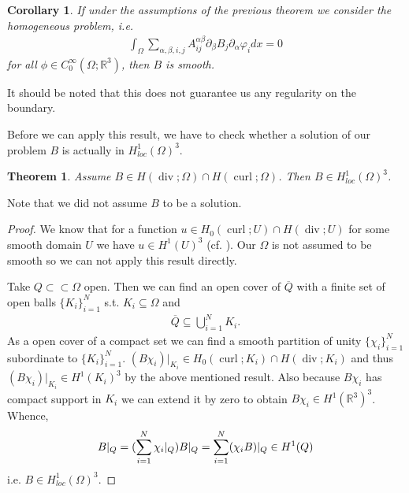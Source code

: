 \documentclass[12pt,a4paper]{article}
\numberwithin{equation}{subsection}
\numberwithin{lemma}{subsection}
\newtheorem{corollary}[lemma]{Corollary}
\newtheorem{theorem}[lemma]{Theorem}
\theoremstyle{definition}
\DeclareMathOperator{\curl}{curl}
\DeclareMathOperator{\diver}{div}
\newcommand{\real}{\mathbb{R}}
\begin{document}
\begin{corollary}\label{cor:smooth_solution}
    If under the assumptions of the previous theorem we consider the 
    homogeneous problem, i.e.
    \begin{align*}
        \int_\Omega \sum\limits_{\alpha,\beta,i,j} 
        A_{ij}^{\alpha \beta} \partial_\beta B_j \partial_\alpha \varphi_i dx =0
    \end{align*}
    for all $\phi \in C^\infty_0(\Omega;\real^3)$, then $B$ is smooth.   
\end{corollary}
It should be noted that this does not guarantee us any regularity on the 
boundary. 

Before we can apply this result, we have to check whether a solution of our 
problem $B$ is actually in $H^1_{loc}(\Omega)^3$. 

\begin{theorem}\label{thm:solution_in_H1loc}
    Assume $B \in H(\diver;\Omega) \cap H(\curl;\Omega)$. Then 
    $B \in H^1_{loc}(\Omega)^3$.
\end{theorem}
Note that we did not assume $B$ to be a solution.
\begin{proof}
    We know that for a function $u \in H_0(\curl;U) \cap H(\diver;U)$ 
    for some smooth domain $U$ we have $u \in H^1(U)^3$ 
    (cf. \cite[Remark 3.48]{monk}). Our $\Omega$ is 
    not assumed to be smooth so we can not apply this result directly.

    Take $Q \subset\subset \Omega$ open. Then we can find an open 
    cover of $\overline{Q}$ with a finite set of open balls $\{K_i\}_{i=1}^N$
    s.t. $K_i \subseteq \Omega$ and 
    \begin{align*}
        \overline{Q} \subseteq \bigcup\limits_{i=1}^N K_i.
    \end{align*}
    As a open cover of a compact set we can find a smooth partition of unity 
    $\{\chi_i\}_{i=1}^N$ subordinate to $\{K_i\}_{i=1}^N$. 
    $(B \chi_i)|_{K_i} \in H_0(\curl;K_i) \cap H(\diver;K_i)$ and thus 
    $(B \chi_i)|_{K_i} \in H^1(K_i)^3$ by the above mentioned result. 
    Also because $B \chi_i$ has compact support in $K_i$ we can extend it by 
    zero to obtain 
    $B \chi_i \in H^1(\real^3)^3$. Whence,
    \begin{align*}
        B|_Q = \large( \sum\limits_{i=1}^N \chi_i |_Q \large) B|_Q = 
        \sum\limits_{i=1}^N (\chi_i B)|_Q \in H^1(Q)
    \end{align*}
    i.e. $B \in H^1_{loc}(\Omega)^3$.
\end{proof}
\end{document}
